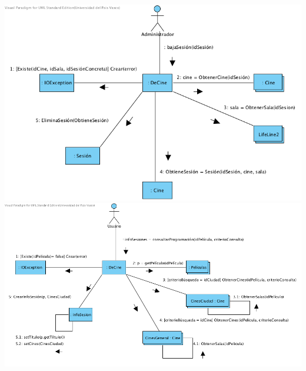 \documentclass{article}
\begin{document}
\begin{center}
\includegraphics[width=1.3\linewidth]{./C-4}
\includegraphics[width=1.3\linewidth]{./C-5}
\end{center}
\end{document}
